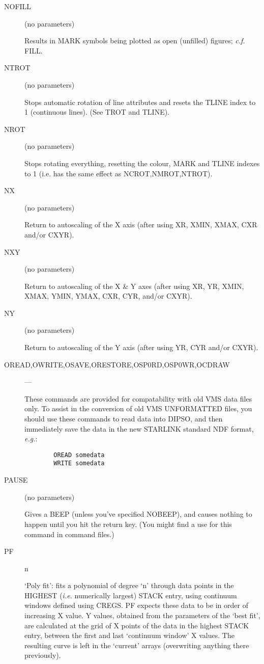 \begin {description}
\item [NOFILL] (no parameters)

Results in MARK symbols being plotted as open (unfilled) figures;
{\it c.f.} FILL.

\item [NTROT] (no parameters)

Stops automatic rotation of line attributes and resets the TLINE index
to 1 (continuous lines). (See TROT and TLINE).

\item [NROT] (no parameters)

Stops rotating everything, resetting the colour, MARK and TLINE
indexes to 1 (i.e. has the same effect as NCROT,NMROT,NTROT).

\item [NX] (no parameters)

Return to autoscaling of the X axis (after using XR, XMIN, XMAX, CXR
and/or CXYR).

\item [NXY] (no parameters)

Return to autoscaling of the X \& Y axes (after using XR, YR, XMIN,
XMAX, YMIN, YMAX, CXR, CYR, and/or CXYR).

\item [NY] (no parameters)

Return to autoscaling of the Y axis (after using YR, CYR and/or CXYR).

\item [OREAD,OWRITE,OSAVE,ORESTORE,OSP0RD,OSP0WR,OCDRAW] ---

These commands are provided for compatability with old VMS data files
only. To assist in the conversion of old VMS UNFORMATTED files, you
should use these commands to read data into DIPSO, and then immediately
save the data in the new STARLINK standard NDF format, {\em e.g.}:

\begin{verbatim}
        OREAD somedata
        WRITE somedata 
\end{verbatim}

\item [PAUSE] (no parameters)

Gives a BEEP (unless you've specified NOBEEP), and causes nothing to
happen until you hit the return key. (You might find a use for this
command in command files.)

\item [PF] n

`Poly fit': fits a polynomial of degree `n' through data points in the
HIGHEST ({\em i.e.} numerically largest) STACK entry, using continuum
windows defined using CREGS. PF expects these data to be in order of
increasing X value. Y values, obtained from the parameters of the
`best fit', are calculated at the grid of X points of the data in the
highest STACK entry, between the first and last `continuum window' X
values. The resulting curve is left in the `current' arrays
(overwriting anything there previously).


\end{description}
